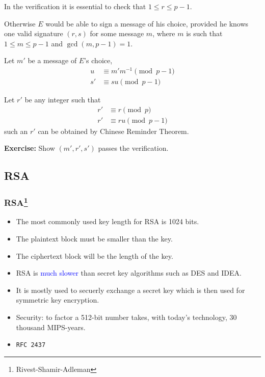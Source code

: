 \begin{frame}
In the verification
it is essential to check that $1\le r\le p-1$. 

Otherwise $E$ would be able to sign a message of his choice, provided
he knows one valid signature $(r,s)$ for some message $m$, where $m$
is such that $1\le m\le p-1$ and $\gcd(m,p-1)=1$.

\begin{minipage}{5cm}
\raggedright
Let $m'$ be a message of $E$'s choice,
\begin{align*}
u  &\equiv m'm^{-1}\pmod{p-1} \\
s' &\equiv su\pmod{p-1}
\end{align*}
\end{minipage}
\vline\hskip 3mm
\begin{minipage}{5cm}
\raggedright
Let $r'$ be any integer such that
\begin{align*}
r' &\equiv r\pmod p \\
r' &\equiv ru\pmod{p-1}
\end{align*}
such an $r'$ can be obtained by Chinese Reminder Theorem.  
\end{minipage}

{\bf Exercise:} Show $(m',r',s')$ passes the verification.
\end{frame}

\subsection{RSA}

\begin{frame}
\frametitle{RSA\footnote{Rivest-Shamir-Adleman}}

\begin{itemize}
\item  The most commonly used key length for RSA is 1024 bits.
\item  The plaintext block must be smaller than the key.
\item  The ciphertext block will be the length of the key.
\item  RSA is \textcolor{blue}{much slower} than secret key algorithms
such as DES and IDEA.
\item  It is mostly used to secuerly exchange a secret key which is
then used for symmetric key encryption.
\item  Security: to factor a 512-bit number takes, with today's
technology, 30 thousand MIPS-years.
\item  {\tt RFC 2437}
\end{itemize}

\end{frame}

